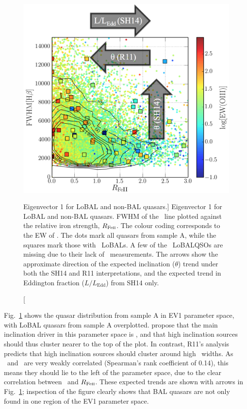 \begin{figure}
\centering
\includegraphics[width=1.0\textwidth]{figures/ewpaper/ev1_arrows.png}
\caption
[Eigenvector 1 for LoBAL and non-BAL quasars.]
{
Eigenvector 1 for LoBAL and non-BAL quasars. 
FWHM of the \hb\ line plotted against the relative
iron strength, $R_{{\rm Fe \textsc{ii}}}$. The colour coding
corresponds to the EW of \oiiifull. The dots mark all quasars from
sample A, while the squares mark those with \mgii\ LoBALs. 
A few of the \mgii\ LoBALQSOs are missing due to their lack of \fwh\ 
measurements. The arrows show the approximate 
direction of the expected inclination ($\theta$)
trend under both the SH14 and R11 interpretations, and the expected 
trend in Eddington fraction ($L/L_{\mathrm{Edd}}$) from SH14 only.
}
\label{fig:bal_ev1}
\end{figure}

Fig.~\ref{fig:bal_ev1} shows the quasar distribution from sample A 
in EV1 parameter space, with LoBAL quasars from sample A overplotted.
\citet[][hereafter SH14]{shenho2014} propose 
that the main inclination driver in this parameter space
is \fwh, and that high inclination sources should thus cluster nearer 
to the top of the plot. In contrast,
R11's analysis predicts that high inclination sources should cluster
around high \ewo\ widths. As \ewo\ and \fwh\ are very weakly correlated
(Spearman's rank coefficient of 0.14), this means they should lie to
the left of the parameter space, due to the clear correlation between \ewo\
and $R_{{\rm Fe \textsc{ii}}}$. These expected trends are shown with arrows
in Fig.~\ref{fig:bal_ev1}; inspection of the figure clearly 
shows that BAL quasars are not only found in one region of the 
EV1 parameter space. 

